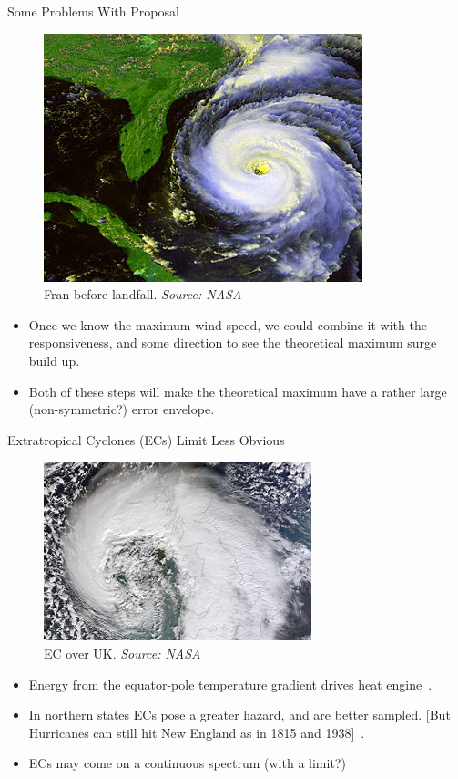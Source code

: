 \begin{frame}{Some Problems With Proposal}
\vspace{-20pt}
\begin{figure}
\includegraphics[width=0.4\linewidth]{images/hurricane_fran.jpg}\\
Fran before landfall. \textit{Source: NASA}
\end{figure}
\begin{itemize}
\item Once we know the maximum wind speed, we could combine it with the responsiveness,
     and some direction to see the theoretical maximum surge build up.
\item Both of these steps will make the theoretical maximum have a rather large
     (non-symmetric?) error envelope.

\end{itemize}
\end{frame}

\begin{frame}{Extratropical Cyclones (ECs) Limit Less Obvious}
\begin{figure}[htb!]
\includegraphics[width=0.4\linewidth]{images/ukstorm_tmo_2014043_tn.jpg}\\
EC over UK. \textit{Source: NASA}
\end{figure}
\begin{itemize}
\item Energy from the equator-pole temperature gradient drives heat engine~\cite{lorenz1960energy, holton2004introduction}.
\item In northern states  ECs pose a greater hazard, and are better sampled.
[But Hurricanes can still hit New England as in 1815 and 1938]~\cite{emanuel2005divine}.
\item ECs may come on a continuous spectrum (with a limit?)
\end{itemize}
\end{frame}

